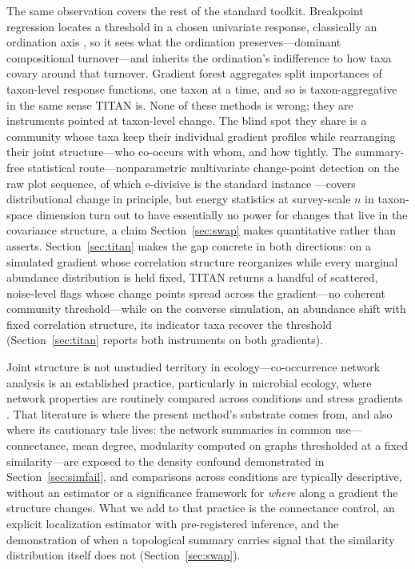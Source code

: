 \documentclass[review,12pt,authoryear]{elsarticle}
\theoremstyle{remark}
\begin{document}
The same observation covers the rest of the standard toolkit. Breakpoint
regression locates a threshold in a chosen univariate response, classically an
ordination axis \citep{toms2003piecewise}, so it sees what the ordination
preserves---dominant compositional turnover---and inherits the ordination's
indifference to how taxa covary around that turnover. Gradient forest
\citep{ellis2012gradientforest} aggregates split importances of taxon-level
response functions, one taxon at a time, and so is taxon-aggregative in the
same sense TITAN is. None of these methods is wrong; they are instruments
pointed at taxon-level change. The blind spot they share is a community whose
taxa keep their individual gradient profiles while rearranging their joint
structure---who co-occurs with whom, and how tightly. The summary-free
statistical route---nonparametric multivariate change-point detection on
the raw plot sequence, of which e-divisive is the standard instance
\citep{matteson2014ediv,james2015ecp}---covers distributional change in
principle, but energy statistics at survey-scale $n$ in taxon-space
dimension turn out to have essentially no power for changes that live in
the covariance structure, a claim Section~\ref{sec:swap} makes quantitative
rather than asserts. Section~\ref{sec:titan}
makes the gap concrete in both directions: on a simulated gradient whose
correlation structure reorganizes while every marginal abundance distribution
is held fixed, TITAN returns a handful of scattered, noise-level flags whose
change points spread across the gradient---no coherent community threshold---while on the converse simulation, an abundance shift with fixed
correlation structure, its indicator taxa recover the threshold
(Section~\ref{sec:titan} reports both instruments on both gradients).

Joint structure is not unstudied territory in ecology---co-occurrence
network analysis is an established practice, particularly in microbial
ecology, where network properties are routinely compared across conditions
and stress gradients \citep{barberan2012networks,faust2012microbial,
devries2018networks}. That literature is where the present method's substrate
comes from, and also where its cautionary tale lives: the network summaries
in common use---connectance, mean degree, modularity computed on graphs
thresholded at a fixed similarity---are exposed to the density confound
demonstrated in Section~\ref{sec:simfail}, and comparisons across conditions
are typically descriptive, without an estimator or a significance framework
for \emph{where} along a gradient the structure changes. What we add to that
practice is the connectance control, an explicit localization estimator with
pre-registered inference, and the demonstration of when a topological summary
carries signal that the similarity distribution itself does not
(Section~\ref{sec:swap}).
\end{document}
